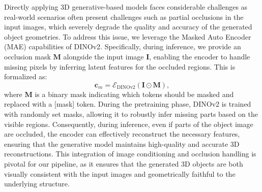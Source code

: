 Directly applying 3D generative-based models faces considerable challenges as
real-world scenarios often present challenges such as partial occlusions in the input images, which severely degrade the quality and accuracy of the generated object geometries. To address this issue, we leverage the Masked Auto Encoder (MAE) capabilities of DINOv2. Specifically, during inference, we provide an occlusion mask $\bm{M}$ alongside the input image $\bm{I}$, enabling the encoder to handle missing pixels by inferring latent features for the occluded regions. This is formalized as:
\begin{equation}
    \bm{c}_m=\mathcal{E}_\text{DINOv2}(\bm{I} \odot \bm{M}),    
\end{equation}
where $\bm{M}$ is a binary mask indicating which tokens should be masked and replaced with a [mask] token. During the pretraining phase, DINOv2 is trained with randomly set masks, allowing it to robustly infer missing parts based on the visible regions. Consequently, during inference, even if parts of the object image are occluded, the encoder can effectively reconstruct the necessary features, ensuring that the generative model maintains high-quality and accurate 3D reconstructions.
%
This integration of image conditioning and occlusion handling is pivotal for our pipeline, as it ensures that the generated 3D objects are both visually consistent with the input images and geometrically faithful to the underlying structure. 





